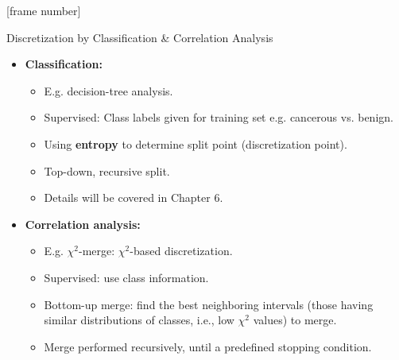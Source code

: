 \documentclass[aspectratio=169,t]{beamer}
\begin{document}
  {
    [frame number]
    \begin{frame}{Discretization by Classification \& Correlation Analysis}
        \begin{itemize}
            \item \textbf{Classification:}
            \begin{itemize}
              \item E.g. decision-tree analysis.
              \item Supervised: Class labels given for training set e.g. cancerous vs. benign.
              \item Using \textbf{entropy} to determine split point (discretization point).
              \item Top-down, recursive split.
              \item Details will be covered in Chapter 6.
            \end{itemize}
            \item \textbf{Correlation analysis:}
            \begin{itemize}
              \item E.g. $\chi^2$-merge: $\chi^2$-based discretization.
              \item Supervised: use class information.
              \item Bottom-up merge: find the best neighboring intervals (those having similar distributions of classes, i.e., low $\chi^2$ values) to merge.
              \item Merge performed recursively, until a predefined stopping condition.
            \end{itemize}
        \end{itemize}
    \end{frame}
  }
\end{document}
